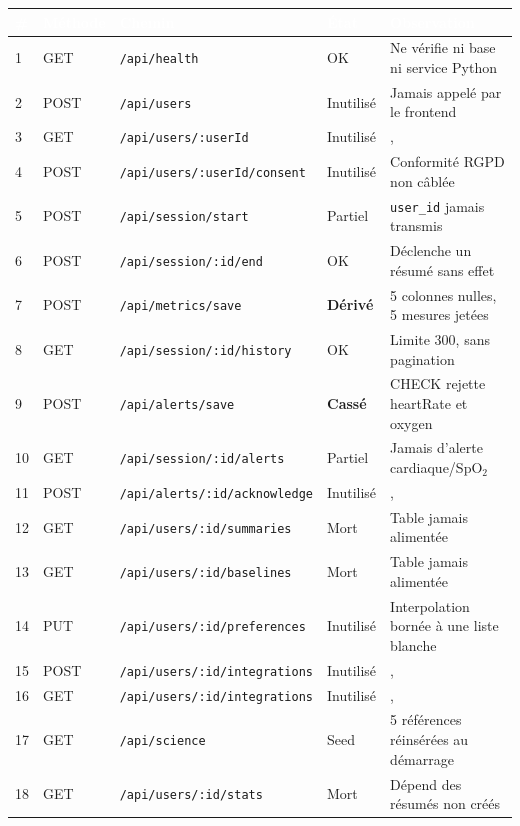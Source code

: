 \documentclass[11pt,a4paper]{article}
\renewcommand{\arraystretch}{1.45}
\begin{document}
\begin{table}[!htbp]
\centering\footnotesize\renewcommand{\arraystretch}{1.12}
\begin{tabularx}{\linewidth}{p{0.6cm} p{1.3cm} p{5.6cm} p{1.7cm} X}
\toprule
\rowcolor{cwblue} \textcolor{white}{\bf \#} & \textcolor{white}{\bf Méthode} & \textcolor{white}{\bf Chemin} &
\textcolor{white}{\bf État} & \textcolor{white}{\bf Observation} \\
\midrule
1 & GET & \texttt{/api/health} & OK & Ne vérifie ni base ni service Python \\
2 & POST & \texttt{/api/users} & Inutilisé & Jamais appelé par le frontend \\
3 & GET & \texttt{/api/users/:userId} & Inutilisé &, \\
4 & POST & \texttt{/api/users/:userId/consent} & Inutilisé & Conformité RGPD non câblée \\
5 & POST & \texttt{/api/session/start} & Partiel & \texttt{user\_id} jamais transmis \\
6 & POST & \texttt{/api/session/:id/end} & OK & Déclenche un résumé sans effet \\
7 & POST & \texttt{/api/metrics/save} & \textbf{Dérivé} & 5 colonnes nulles, 5 mesures jetées \\
8 & GET & \texttt{/api/session/:id/history} & OK & Limite 300, sans pagination \\
9 & POST & \texttt{/api/alerts/save} & \textbf{Cassé} & CHECK rejette heartRate et oxygen \\
10 & GET & \texttt{/api/session/:id/alerts} & Partiel & Jamais d'alerte cardiaque/SpO$_2$ \\
11 & POST & \texttt{/api/alerts/:id/acknowledge} & Inutilisé &, \\
12 & GET & \texttt{/api/users/:id/summaries} & Mort & Table jamais alimentée \\
13 & GET & \texttt{/api/users/:id/baselines} & Mort & Table jamais alimentée \\
14 & PUT & \texttt{/api/users/:id/preferences} & Inutilisé & Interpolation bornée à une liste blanche \\
15 & POST & \texttt{/api/users/:id/integrations} & Inutilisé &, \\
16 & GET & \texttt{/api/users/:id/integrations} & Inutilisé &, \\
17 & GET & \texttt{/api/science} & Seed & 5 références réinsérées au démarrage \\
18 & GET & \texttt{/api/users/:id/stats} & Mort & Dépend des résumés non créés \\

\end{tabularx}
\end{table}
\end{document}
